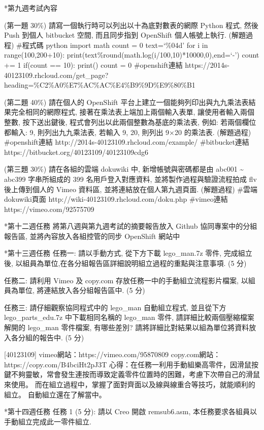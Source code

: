\documentclass[]{article}
\begin{document}
*第九週考試內容

(第一題 30\%) 請寫一個執行時可以列出以十為底對數表的網際 Python 程式,
然後 Push 到個人 bitbucket 空間, 而且同步指到 OpenShift 個人帳號上執行.
(解題過程) \#程式碼 python import math count = 0 text=`\%04d' for i in
range(100,200+10):
print(text\%round(math.log(i/100,10)*10000,0),end=`-') count += 1
if(count == 10): print() count = 0 \#openshift連結
https://2014s-40123109.rhcloud.com/get\_page?heading=\%C2\%A0\%E7\%AC\%AC\%E4\%B9\%9D\%E9\%80\%B1

(第二題 40\%) 請在個人的 OpenShift
平台上建立一個能夠列印出與九九乘法表結果完全相同的網際程式,
接著在乘法表上端加上兩個輸入表單, 讓使用者輸入兩個整數, 按下送出鍵後,
程式會列出以此兩個整數為基底的乘法表, 例如: 若兩個欄位都輸入: 9,
則列出九九乘法表, 若輸入 9, 20, 則列出 9×20 的乘法表. (解題過程)
\#openshift連結 http://2014s-40123109.rhcloud.com/example/
\#bitbucket連結 https://bitbucket.org/40123109/40123109cdg6

(第三題 30\%) 請在各組的雲端 dokuwiki 中, 新增帳號與密碼都是由 abc001
\textasciitilde{} abc399 字串所組成的 399 名用戶登入對應資料,
並將製作過程與驗證流程拍成 flv 後上傳到個人的 Vimeo 資料區,
並將連結放在個人第九週頁面. (解題過程) \#雲端dokuwiki頁面
http://wiki-40123109.rhcloud.com/doku.php \#vimeo連結
https://vimeo.com/92575709

*第十二週任務 將第八週與第九週考試的摘要報告放入 Github
協同專案中的分組報告區, 並將內容放入各組控管的同步 OpenShift 網站中

*第十三週任務 任務一: 請以手動方式, 從下方下載 lego\_man.7z 零件,
完成組立後, 以組員為單位,在各分組報告區詳細說明組立過程的重點與注意事項.
(5 分)

任務二: 請利用 Vimeo 及 copy.com 存放任務一中的手動組立流程影片檔案,
以組員為單位, 將連結放入各分組報告區中. (5 分)

任務三: 請仔細觀察協同程式中的 lego\_man 自動組立程式, 並且從下方
lego\_parts\_edu.7z 中下載相同名稱的 lego\_man 零件,
請詳細比較兩個壓縮檔案解開的 lego\_man 零件檔案, 有哪些差別?
請將詳細比對結果以組為單位將資料放入各分組的報告中. (5 分)

{[}40123109{]} vimeo網站：https://vimeo.com/95870809
copy.com網站：https://copy.com/B4bciHt2pJ3T
心得：在任務一利用手動組樂高零件，因滑鼠按鍵不夠靈敏，常會發生連按而導致定義零件位置時的困難，考慮下次帶自己的滑鼠來使用。
而在組立過程中，掌握了面對齊面以及線與線重合等技巧，就能順利的組立。
自動組立還在了解當中。

*第十四週任務 任務 1 (5 分): 請以 Creo 開啟 remsub6.asm,
本任務要求各組員以手動組立完成此一零件組立.
\end{document}
